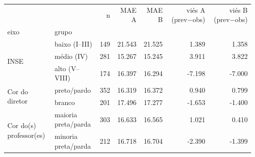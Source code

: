 \begin{tabular}{llrrrrr}
\toprule
 &  & n & MAE A & MAE B & viés A (prev−obs) & viés B (prev−obs) \\
eixo & grupo &  &  &  &  &  \\
\midrule
\multirow[t]{3}{*}{INSE} & baixo (I–III) & 149 & 21.543 & 21.525 & 1.389 & 1.358 \\
 & médio (IV) & 281 & 15.267 & 15.245 & 3.911 & 3.822 \\
 & alto (V–VIII) & 174 & 16.397 & 16.294 & -7.198 & -7.000 \\
\cline{1-7}
\multirow[t]{2}{*}{Cor do diretor} & preto/pardo & 352 & 16.319 & 16.372 & 0.940 & 0.799 \\
 & branco & 201 & 17.496 & 17.277 & -1.653 & -1.400 \\
\cline{1-7}
\multirow[t]{2}{*}{Cor do(s) professor(es)} & maioria preta/parda & 303 & 16.633 & 16.565 & 1.021 & 0.410 \\
 & minoria preta/parda & 212 & 16.718 & 16.704 & -2.390 & -1.399 \\
\cline{1-7}
\bottomrule
\end{tabular}
